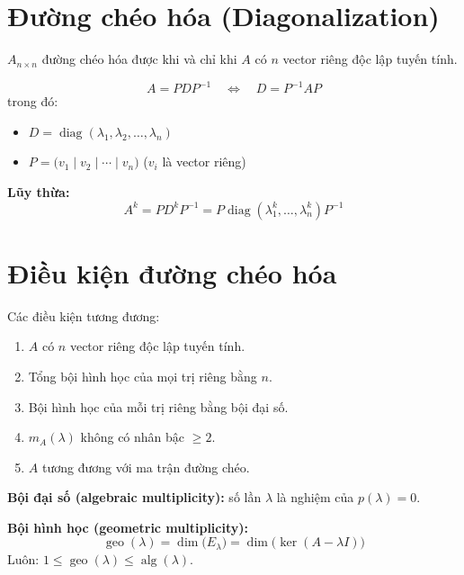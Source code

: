 
\section{Đường chéo hóa (Diagonalization)}

$A_{n \times n}$ đường chéo hóa được khi và chỉ khi $A$ có $n$ vector riêng độc lập tuyến tính.

\[
A = PDP^{-1} \quad \Longleftrightarrow \quad D = P^{-1}AP
\]
trong đó:
\begin{itemize}
    \item $D = \operatorname{diag}(\lambda_1, \lambda_2, \dots, \lambda_n)$
    \item $P = \bigl(v_1 \mid v_2 \mid \cdots \mid v_n\bigr)$ \quad ($v_i$ là vector riêng)
\end{itemize}

\textbf{Lũy thừa:}
\[
A^k = PD^kP^{-1} = P\operatorname{diag}(\lambda_1^k, \dots, \lambda_n^k)P^{-1}
\]

\section{Điều kiện đường chéo hóa}

Các điều kiện tương đương:
\begin{enumerate}
    \item $A$ có $n$ vector riêng độc lập tuyến tính.
    \item Tổng bội hình học của mọi trị riêng bằng $n$.
    \item Bội hình học của mỗi trị riêng bằng bội đại số.
    \item $m_A(\lambda)$ không có nhân bậc $\ge 2$.
    \item $A$ tương đương với ma trận đường chéo.
\end{enumerate}

\textbf{Bội đại số (algebraic multiplicity):} số lần $\lambda$ là nghiệm của $p(\lambda) = 0$.

\textbf{Bội hình học (geometric multiplicity):}
\[
\operatorname{geo}(\lambda) = \dim\bigl(E_\lambda\bigr) = \dim\bigl(\ker(A - \lambda I)\bigr)
\]
Luôn: $1 \le \operatorname{geo}(\lambda) \le \operatorname{alg}(\lambda)$.

